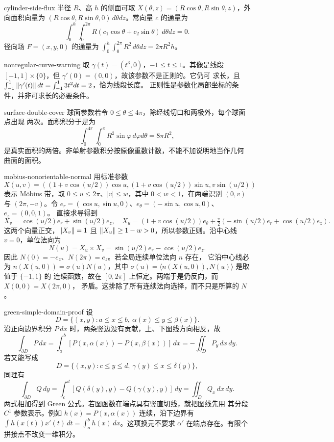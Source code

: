 \begin{solution}{cylinder-side-flux}
半径 $R$、高 $h$ 的侧面可取
$X(\theta,z)=(R\cos\theta,R\sin\theta,z)$，外向面积向量为
$(R\cos\theta,R\sin\theta,0)\,d\theta dz$。常向量 $c$ 的通量为
\[
 \int_0^h\int_0^{2\pi}R(c_1\cos\theta+c_2\sin\theta)\,d\theta dz=0.
\]
径向场 $F=(x,y,0)$ 的通量为
$\int_0^h\int_0^{2\pi}R^2\,d\theta dz=2\pi R^2h$。
\end{solution}

\begin{solution}{nonregular-curve-warning}
取 $\gamma(t)=(t^3,0)$，$-1\le t\le1$。其像是线段
$[-1,1]\times\{0\}$，但 $\gamma'(0)=(0,0)$，故该参数不是正则的。它仍可
求长，且
$\int_{-1}^1\left\lVert\gamma'(t)\right\rVert dt=\int_{-1}^13t^2dt=2$，恰为线段长度。
正则性是参数化局部坐标的条件，并非可求长的必要条件。
\end{solution}

\begin{solution}{surface-double-cover}
球面参数若令 $0\le\theta\le4\pi$，除经线切口和两极外，每个球面点出现
两次。面积积分于是为
\[
 \int_0^{4\pi}\int_0^\pi R^2\sin\varphi\,d\varphi d\theta=8\pi R^2,
\]
是真实面积的两倍。非单射参数积分按原像重数计数，不能不加说明地当作几何
曲面的面积。
\end{solution}

\begin{solution}{mobius-nonorientable-normal}
用标准参数
\[
 X(u,v)=((1+v\cos(u/2))\cos u,
 (1+v\cos(u/2))\sin u,v\sin(u/2))
\]
表示 Möbius 带，取 $0\le u\le2\pi$、$|v|\le w$，其中 $0<w<1$，在两端识别
$(0,v)$ 与 $(2\pi,-v)$。令
$e_r=(\cos u,\sin u,0)$、$e_\theta=(-\sin u,\cos u,0)$、$e_z=(0,0,1)$。
直接求导得到
\[
 X_v=\cos(u/2)e_r+\sin(u/2)e_z,
 \quad
 X_u=(1+v\cos(u/2))e_\theta
       +\tfrac v2(-\sin(u/2)e_r+\cos(u/2)e_z).
\]
这两个向量正交，$\left\lVert X_v\right\rVert=1$ 且
$\left\lVert X_u\right\rVert\ge1-w>0$，所以参数正则。沿中心线 $v=0$，单位法向为
\[
 N(u)=X_u\times X_v
     =\sin(u/2)e_r-\cos(u/2)e_z.
\]
因此 $N(0)=-e_z$、$N(2\pi)=e_z$。若全局连续单位法向 $n$ 存在，
它沿中心线必为 $n(X(u,0))=\sigma(u)N(u)$，其中
$\sigma(u)=\langle n(X(u,0)),N(u)\rangle$ 是取值于 $\{-1,1\}$ 的
连续函数，故在 $[0,2\pi]$ 上恒定。两端于是仍反向，而 $X(0,0)=X(2\pi,0)$，
矛盾。这排除了所有连续法向选择，而不只是所算的 $N$。
\end{solution}

\begin{solution}{green-simple-domain-proof}
设
\[
 D=\{(x,y):a\le x\le b,\ \alpha(x)\le y\le\beta(x)\}.
\]
沿正向边界积分 \(P\,dx\) 时，两条竖边没有贡献，上、下图线方向相反，故
\[
 \int_{\partial D}P\,dx
 =\int_a^b[P(x,\alpha(x))-P(x,\beta(x))]\,dx
 =-\iint_D P_y\,dx\,dy.
\]
若又能写成
\[
 D=\{(x,y):c\le y\le d,\ \gamma(y)\le x\le\delta(y)\},
\]
同理有
\[
 \int_{\partial D}Q\,dy
 =\int_c^d[Q(\delta(y),y)-Q(\gamma(y),y)]\,dy
 =\iint_D Q_x\,dx\,dy.
\]
两式相加得到 Green 公式。若图函数在端点具有竖直切线，就把图线先用
其分段 $C^1$ 参数表示。例如 $h(x)=P(x,\alpha(x))$ 连续，沿下边界有
$\int h(x(t))x'(t)\,dt=\int_a^b h(x)\,dx$。这项换元不要求
$\alpha'$ 在端点存在。有限个拼接点不改变一维积分。
\end{solution}

